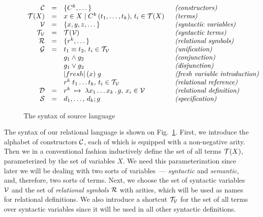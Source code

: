 \begin{figure}[t]
\small
$$
\begin{array}{rcll}
\meta{C}    & = & \{C^k,\dots\}                                        & \;\;\mbox{\emph{(constructors)}}\\
\meta{T}(X) & = & x\in X \mid C^k\,(t_1,\dots,t_k),\,t_i\in \meta{T}(X) & \;\;\mbox{\emph{(terms)}}\\
\meta{V}    & = & \{x, y, z, \dots\}                                   & \;\;\mbox{\emph{(syntactic variables)}}\\
\meta{T_V}  & = & \meta{T}(\meta{V})                                   & \;\;\mbox{\emph{(syntactic terms)}}\\
\meta{R}    & = & \{r^k,\dots\}                                        & \;\;\mbox{\emph{(relational symbols)}}\\
\meta{G}    & = & t_1\equiv t_2,\,t_i\in\meta{T_V}                      & \;\;\mbox{\emph{(unification)}}\\ 
            &   & g_1\wedge g_2                                        & \;\;\mbox{\emph{(conjunction)}}\\
            &   & g_1\vee g_2                                          & \;\;\mbox{\emph{(disjunction)}}\\
            &   &\lstinline|fresh|\,(x)\;g                             & \;\;\mbox{\emph{(fresh variable introduction)}}\\
            &   &r^k\;t_1\dots t_k,\,t_i\in\meta{T_V}                   & \;\;\mbox{\emph{(relational reference)}}\\
\meta{D}    & = & r^k\binds\lambda x_1\dots x_k\,.\,g,\,x_i\in\meta{V}  & \;\;\mbox{\emph{(relational definition)}}\\
\meta{S}    & = & d_1,\dots,\,d_k; g                                    & \;\;\mbox{\emph{(specification)}}
\end{array}
$$
\caption{The syntax of source language}
\label{syntax}
\end{figure}

The syntax of our relational language is shown on Fig.~\ref{syntax}. First, we introduce the alphabet of constructors ${\mathcal{C}}$, each of which is equipped with a 
non-negative arity. Then we in a conventional fashion inductively define the set of all terms ${\mathcal{T}}(X)$, parameterized by the set of variables $X$. We need this parameterization 
since later we will be dealing with two sorts of variables~--- \emph{syntactic} and \emph{semantic}, and, therefore, two sorts of terms. Next, we choose the set of syntactic variables
${\mathcal{V}}$ and the set of \emph{relational symbols} ${\mathcal{R}}$ with arities, which will be used as names for relational definitions. We also introduce a shortcut
${\mathcal{T_V}}$ for the set of all terms over syntactic variables since it will be used in all other syntactic definitions.

